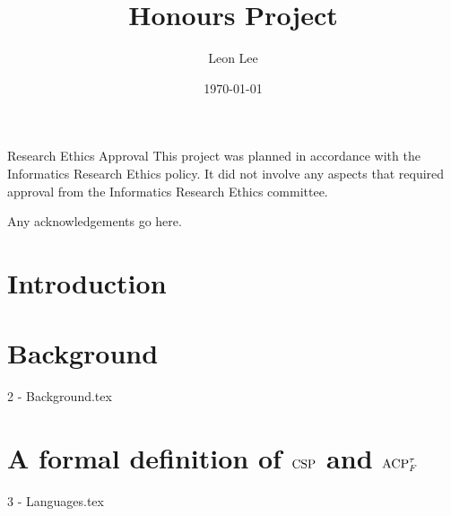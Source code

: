 \documentclass[logo,bsc,singlespacing,parskip,online]{infthesis}
\begin{document}
\begin{preliminary}

\title{Honours Project}

\author{Leon Lee}
\date{\today}


\maketitle

\newenvironment{ethics}
   {\begin{frontenv}{Research Ethics Approval}{\LARGE}}
   {\end{frontenv}\newpage}

\begin{ethics}
This project was planned in accordance with the Informatics Research
Ethics policy. It did not involve any aspects that required approval
from the Informatics Research Ethics committee.

\standarddeclaration
\end{ethics}


\begin{acknowledgements}
Any acknowledgements go here.
\end{acknowledgements}


\tableofcontents
\end{preliminary}


\chapter{Introduction}

\chapter{Background}
{2 - Background.tex}

\chapter{A formal definition of \texorpdfstring{$\mathrm{CSP}$}{CSP} and \texorpdfstring{$\mathrm{ACP}_{F}^{\tau}$}{ACP}}
{3 - Languages.tex}
\end{document}
